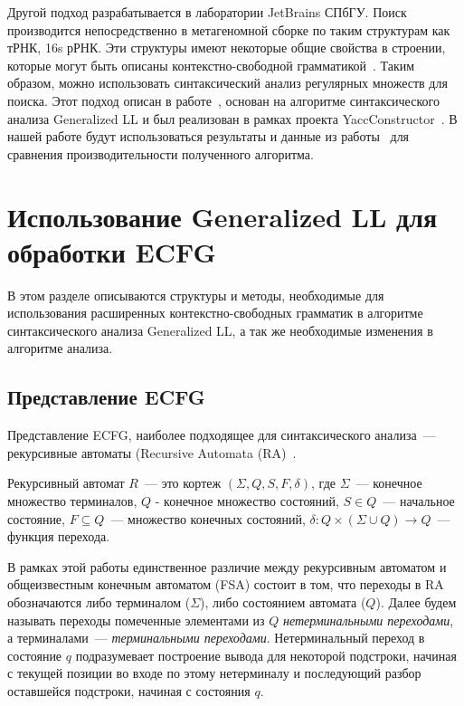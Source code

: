 Другой подход разрабатывается в лаборатории JetBrains СПбГУ.
Поиск производится непосредственно в метагеномной сборке по таким структурам как тРНК, 16s рРНК.
Эти структуры имеют некоторые общие свойства в строении, которые могут быть описаны
контекстно-свободной грамматикой~\cite{Anderson2013a}.
Таким образом, можно использовать синтаксический анализ регулярных множеств для поиска.
Этот подход описан в работе~\cite{ragozina}, основан на алгоритме синтаксического анализа Generalized LL и 
был реализован в рамках проекта YaccConstructor~\cite{YaccConstructor}. В нашей работе 
будут использоваться результаты и данные из работы~\cite{ragozina} для сравнения производительности полученного алгоритма.

\section{Использование Generalized LL для обработки ECFG}

В этом разделе описываются структуры и методы, необходимые для использования расширенных контекстно-свободных грамматик 
в алгоритме синтаксического анализа Generalized LL, а так же необходимые изменения в алгоритме анализа.

\subsection{Представление ECFG}

Представление ECFG, наиболее подходящее для синтаксического анализа~--- рекурсивные автоматы
(Recursive Automata (RA)~\cite{tellier2006learning}.
\begin{mydef}
	Рекурсивный автомат $R$~--- это кортеж $(\Sigma, Q, S, F, \delta)$, где $\Sigma$~--- конечное множество терминалов, $Q$ - конечное множество состояний, $S \in Q$~--- начальное состояние, $F \subseteq Q$~--- множество конечных состояний, $\delta : Q \times (\Sigma \cup Q) \to Q$~--- функция перехода.
\end{mydef}
В рамках этой работы единственное различие между рекурсивным автоматом и общеизвестным
конечным автоматом (FSA) состоит в том, что переходы в RA обозначаются либо терминалом ($\Sigma$),
либо состоянием автомата ($Q$). Далее будем называть переходы помеченные элементами из
$Q$ \textit{нетерминальными переходами}, а терминалами~--- \textit{терминальными переходами}.
Нетерминальный переход в состояние $q$ подразумевает построение вывода для некоторой подстроки, начиная с текущей позиции во входе
по этому нетерминалу и последующий разбор оставшейся подстроки, начиная с состояния $q$.

